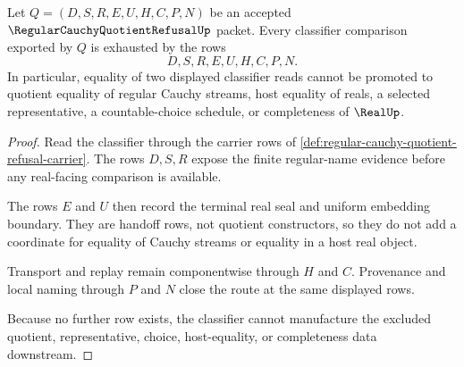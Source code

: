 \begin{theorem}
\label{thm:regular-cauchy-quotient-refusal-classifier-nonescape}
Let $Q=(D,S,R,E,U,H,C,P,N)$ be an accepted $\RegularCauchyQuotientRefusalUp$ packet. Every classifier comparison exported by $Q$ is exhausted by the rows
$$
D,S,R,E,U,H,C,P,N .
$$
In particular, equality of two displayed classifier reads cannot be promoted to quotient equality of regular Cauchy streams, host equality of reals, a selected representative, a countable-choice schedule, or completeness of $\RealUp$.
\end{theorem}
\begin{proof}
Read the classifier through the carrier rows of \autoref{def:regular-cauchy-quotient-refusal-carrier}. The rows $D,S,R$ expose the finite regular-name evidence before any real-facing comparison is available.

The rows $E$ and $U$ then record the terminal real seal and uniform embedding boundary. They are handoff rows, not quotient constructors, so they do not add a coordinate for equality of Cauchy streams or equality in a host real object.

Transport and replay remain componentwise through $H$ and $C$. Provenance and local naming through $P$ and $N$ close the route at the same displayed rows.

Because no further row exists, the classifier cannot manufacture the excluded quotient, representative, choice, host-equality, or completeness data downstream.
\end{proof}

